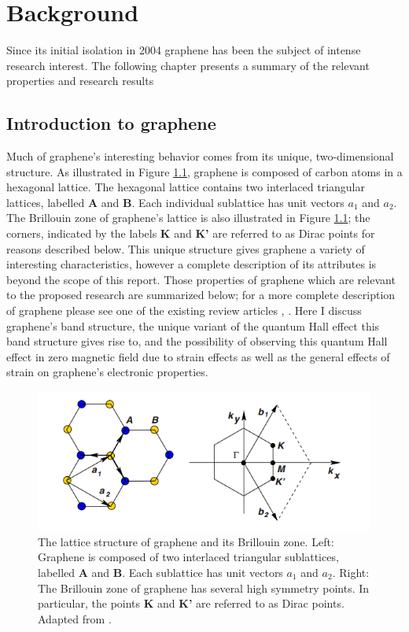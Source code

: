 \documentclass[edeposit,fullpage,draftthesis]{uiucthesis2009}
\begin{document}
\chapter{Background}

    Since its initial isolation in 2004 graphene has been the subject of intense research interest. 
    The following chapter presents a summary of the relevant properties and research results 

    \section{Introduction to graphene}

    Much of graphene's interesting behavior comes from its unique, two-dimensional structure. As illustrated in Figure \ref{fig:lattice}, graphene is composed of carbon atoms in a hexagonal lattice. The hexagonal lattice contains two interlaced triangular lattices, labelled \textbf{A} and \textbf{B}. Each individual sublattice has unit vectors $a_1$ and $a_2$. The Brillouin zone of graphene's lattice is also illustrated in Figure \ref{fig:lattice}; the corners, indicated by the labels \textbf{K} and \textbf{K'} are referred to as Dirac points for reasons described below. 
    This unique structure gives graphene  a variety of interesting characteristics, however a complete description of its attributes is beyond the scope of this report. Those properties of graphene which are relevant to the proposed research are summarized below; for a more complete description of graphene please see one of the existing review articles \cite{Geim2007}, \cite{CastroNeto2009}. Here I discuss graphene's band structure, the unique variant of the quantum Hall effect this band structure gives rise to, and the possibility of observing this quantum Hall effect in zero magnetic field due to strain effects as well as the general effects of strain on graphene's electronic properties.

    \begin{figure}
    \centering
    \includegraphics{images/background/ElecPropertiesFig2.png}
    \caption[The lattice structure of graphene and its Brillouin zone]{The lattice structure of graphene and its Brillouin zone. Left: Graphene is composed of two interlaced triangular sublattices, labelled \textbf{A} and \textbf{B}. Each sublattice has unit vectors $a_1$ and $a_2$. Right: The Brillouin zone of graphene has several high symmetry points. In particular, the points \textbf{K} and \textbf{K'} are referred to as Dirac points. Adapted from \cite{CastroNeto2009}.}
    \label{fig:lattice}
    \end{figure}
		
\end{document}
